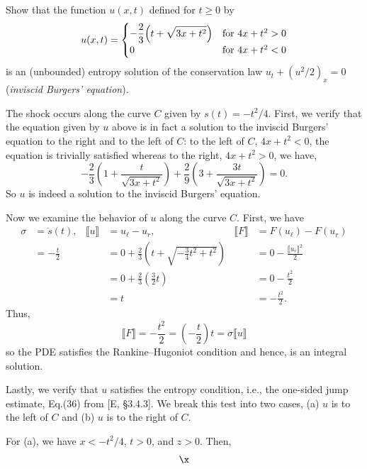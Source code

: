 \begin{problem}
  Show that the function \(u(x,t)\) defined for \(t\geq 0\) by
  \[
    u(x,t)=
    \begin{cases}
      \displaystyle-\frac{2}{3}\Bigl(t+\sqrt{3x+t^2}\Bigr)
      &\text{for \(4x+t^2>0\)}\\
      0
      &\text{for \(4x+t^2<0\)}
    \end{cases}
  \]
  is an (unbounded) entropy solution of the conservation law
  \(u_t+(u^2/2)_x=0\) (\emph{inviscid Burgers' equation}).
\end{problem}
\begin{solution}
  The shock occurs along the curve \(C\) given by \(s(t)=-t^2/4\). First,
  we verify that the equation given by \(u\) above is in fact a solution to
  the inviscid Burgers' equation to the right and to the left of \(C\): to
  the left of \(C\), \(4x+t^2<0\), the equation is trivially satisfied
  whereas to the right, \(4x+t^2>0\), we have,
  \[
    -\frac{2}{3}\left(1+\frac{t}{\sqrt{3x+t^2}}\right)
    +\frac{2}{9}\left(3+\frac{3t}{\sqrt{3x+t^2}}\right)
    =0.
  \]
  So \(u\) is indeed a solution to the inviscid Burgers' equation.

  Now we examine the behavior of \(u\) along the curve \(C\). First, we
  have
  \begin{align*}
    \sigma&=\dot s(t),
    &\llbracket u\rrbracket
    &=u_\ell-u_r,
    &\llbracket F\rrbracket
    &=F(u_\ell)-F(u_r)\\
          &=-\frac{t}{2}
    &&=0+\frac{2}{3}\left(t+\sqrt{-\tfrac{3}{4}t^2+t^2}\right)
    &&=0-\frac{\llbracket u_r\rrbracket^2}{2}\\
          &&
    &=0+\frac{2}{3}\left(\frac{3}{2}t\right)
    &&=0-\frac{t^2}{2}
    \\
          &&&=t&&=-\frac{t^2}{2}.
  \end{align*}
  Thus,
  \[
    \llbracket
    F\rrbracket=-\frac{t^2}{2}=\left(-\frac{t}{2}\right)t=\sigma\llbracket
    u\rrbracket
  \]
  so the PDE satisfies the Rankine--Hugoniot condition and hence, is an
  integral solution.

  Lastly, we verify that \(u\) satisfies the entropy condition, i.e., the
  one-sided jump estimate, Eq.\@ (36) from [E, \S 3.4.3]. We break this
  test into two cases, (a) \(u\) is to the left of \(C\) and (b) \(u\) is
  to the right of \(C\).

  For (a), we have \(x<-t^2/4\), \(t>0\), and \(z>0\). Then,
  \begin{align*}
    \x
  \end{align*}
\end{solution}


